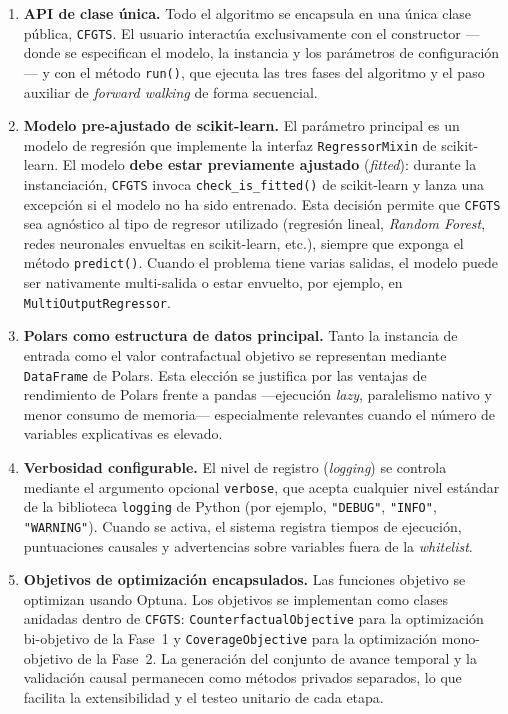 \documentclass[12pt]{report} %
\begin{document}
\begin{enumerate}
    \item \textbf{API de clase única.} Todo el algoritmo se encapsula en una única clase pública, \texttt{CFGTS}. El usuario interactúa exclusivamente con el constructor ---donde se especifican el modelo, la instancia y los parámetros de configuración--- y con el método \texttt{run()}, que ejecuta las tres fases del algoritmo y el paso auxiliar de \textit{forward walking} de forma secuencial.

    \item \textbf{Modelo pre-ajustado de scikit-learn.} El parámetro principal es un modelo de regresión que implemente la interfaz \texttt{RegressorMixin} de scikit-learn. El modelo \textbf{debe estar previamente ajustado} (\textit{fitted}): durante la instanciación, \texttt{CFGTS} invoca \texttt{check\_is\_fitted()} de scikit-learn y lanza una excepción si el modelo no ha sido entrenado. Esta decisión permite que \texttt{CFGTS} sea agnóstico al tipo de regresor utilizado (regresión lineal, \textit{Random Forest}, redes neuronales envueltas en scikit-learn, etc.), siempre que exponga el método \texttt{predict()}. Cuando el problema tiene varias salidas, el modelo puede ser nativamente multi-salida o estar envuelto, por ejemplo, en \texttt{MultiOutputRegressor}.

    \item \textbf{Polars como estructura de datos principal.} Tanto la instancia de entrada como el valor contrafactual objetivo se representan mediante \texttt{DataFrame} de Polars. Esta elección se justifica por las ventajas de rendimiento de Polars frente a pandas ---ejecución \textit{lazy}, paralelismo nativo y menor consumo de memoria--- especialmente relevantes cuando el número de variables explicativas es elevado.

    \item \textbf{Verbosidad configurable.} El nivel de registro (\textit{logging}) se controla mediante el argumento opcional \texttt{verbose}, que acepta cualquier nivel estándar de la biblioteca \texttt{logging} de Python (por ejemplo, \texttt{"DEBUG"}, \texttt{"INFO"}, \texttt{"WARNING"}). Cuando se activa, el sistema registra tiempos de ejecución, puntuaciones causales y advertencias sobre variables fuera de la \textit{whitelist}.

    \item \textbf{Objetivos de optimización encapsulados.} Las funciones objetivo se optimizan usando Optuna. Los objetivos se implementan como clases anidadas dentro de \texttt{CFGTS}: \texttt{CounterfactualObjective} para la optimización bi-objetivo de la Fase~1 y \texttt{CoverageObjective} para la optimización mono-objetivo de la Fase~2. La generación del conjunto de avance temporal y la validación causal permanecen como métodos privados separados, lo que facilita la extensibilidad y el testeo unitario de cada etapa.
\end{enumerate}
\end{document}
